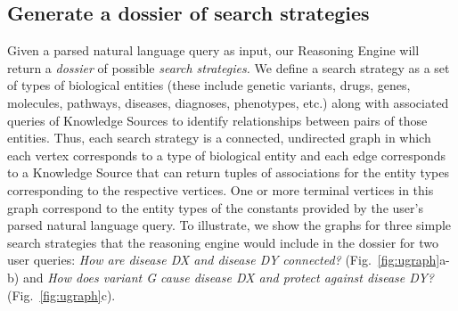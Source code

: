 \documentclass[11pt,notitlepage]{article}
\begin{document}
\subsection{Generate a dossier of search strategies}
\label{section:strategies}
Given a parsed natural language query as input, our Reasoning Engine will return
a {\em dossier\/} of possible {\em search strategies.\/} We define a search
strategy as a set of types of biological entities (these include genetic
variants, drugs, genes, molecules, pathways, diseases, diagnoses, phenotypes,
etc.) along with associated queries of Knowledge Sources to identify
relationships between pairs of those entities. Thus, each search strategy is a
connected, undirected graph in which each vertex corresponds to a type of
biological entity and each edge corresponds to a Knowledge Source that can
return tuples of associations for the entity types corresponding to the
respective vertices.  One or more terminal vertices in this graph correspond to
the entity types of the constants provided by the user's parsed natural language
query. To illustrate, we show the graphs for three simple search strategies that
the reasoning engine would include in the dossier for two user queries: {\em How
  are disease DX and disease DY connected?\/} (Fig.~\ref{fig:ugraph}a-b) and
{\em How does variant G cause disease DX and protect against disease DY?\/}
(Fig.~\ref{fig:ugraph}c).
\end{document}
